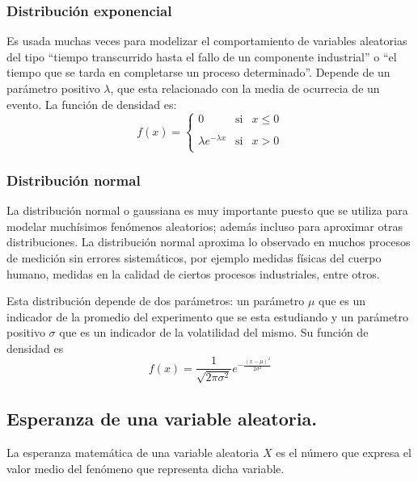 \documentclass[
  12pt,
]{krantz}
\theoremstyle{definition}
\theoremstyle{definition}
\theoremstyle{definition}
\theoremstyle{remark}
\begin{document}
\hypertarget{distribucion-exponencial}{%
\subsubsection{Distribución exponencial}\label{distribucion-exponencial}}

Es usada muchas veces para modelizar el comportamiento de variables aleatorias del tipo ``tiempo transcurrido hasta el fallo de un componente industrial'' o ``el tiempo que se tarda en completarse un proceso determinado''. Depende de un parámetro positivo \(\lambda\), que esta relacionado con la media de ocurrecia de un evento. La función de densidad es:\[f(x)= \left\{ \begin{array}{lcc}
             0 &   \textrm{si}  & x \leq 0 \\
             \\ \lambda e^{-\lambda x} &  \textrm{si} & x>0 \\
             \end{array}
   \right.\]

\hypertarget{distribucion-normal}{%
\subsubsection{Distribución normal}\label{distribucion-normal}}

La distribución normal o gaussiana es muy importante puesto que se utiliza para modelar muchísimos fenómenos aleatorios; además incluso para aproximar otras distribuciones. La distribución normal aproxima lo observado en muchos procesos de medición sin errores sistemáticos, por ejemplo medidas físicas del cuerpo humano, medidas en la calidad de ciertos procesos industriales, entre otros.

Esta distribución depende de dos parámetros: un parámetro \(\mu\) que es un indicador de la promedio del experimento que se esta estudiando y un parámetro positivo \(\sigma\) que es un indicador de la volatilidad del mismo. Su función de densidad es \[f(x)=\frac{1}{\sqrt{2\pi\sigma^2}}e^{-\frac{(x-\mu)^2}{2\sigma^2}}\]

\hypertarget{esperanza-de-una-variable-aleatoria.}{%
\subsection{Esperanza de una variable aleatoria.}\label{esperanza-de-una-variable-aleatoria.}}

La esperanza matemática de una variable aleatoria \(X\) es el número que expresa el valor medio del fenómeno que representa dicha variable.
\end{document}

